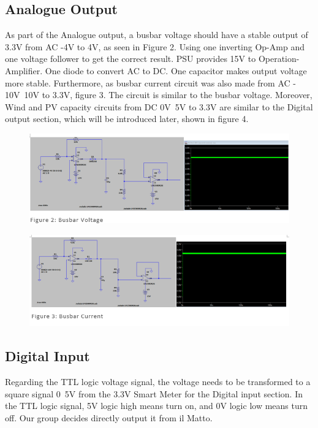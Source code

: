 \documentclass[9pt, technote, a4paper, nofonttune]{IEEEphot}
\begin{document}
        \subsection{Analogue Output}
        \hspace{0.5cm}As part of the Analogue output, a busbar voltage should have a stable 
        output of 3.3V from AC -4V to 4V, as seen in Figure 2. Using one inverting Op-Amp 
        and one voltage follower to get the correct result. PSU provides 15V to Operation-
        Amplifier. One diode to convert AC to DC. One capacitor makes output voltage more 
        stable. Furthermore, as busbar current circuit was also made from AC - 10V~10V to 
        3.3V, figure 3. The circuit is similar to the busbar voltage. Moreover, Wind and PV 
        capacity circuits from DC 0V~5V to 3.3V are similar to the Digital output section, 
        which will be introduced later, shown in figure 4.\vspace*{-6pt}
        \begin{figure}[h]
        \centering
        \includegraphics[width=30pc]{D5/4AC.png}
        \label{fig_env1}
        \end{figure}\vspace*{-6pt}
        \begin{figure}[h]
        \centering
        \includegraphics[width=30pc]{D5/10AC.png}
        \label{fig_env1}
        \end{figure}\vspace*{-12pt}
        
        \subsection{Digital Input}
        \hspace{0.5cm} Regarding the TTL logic voltage signal, the voltage needs to be 
        transformed to a square signal 0~5V from the 3.3V Smart Meter for the Digital input 
        section. In the TTL logic signal, 5V logic high means turn on, and 0V logic low 
        means turn off. Our group decides directly output it from il Matto.
\end{document}
